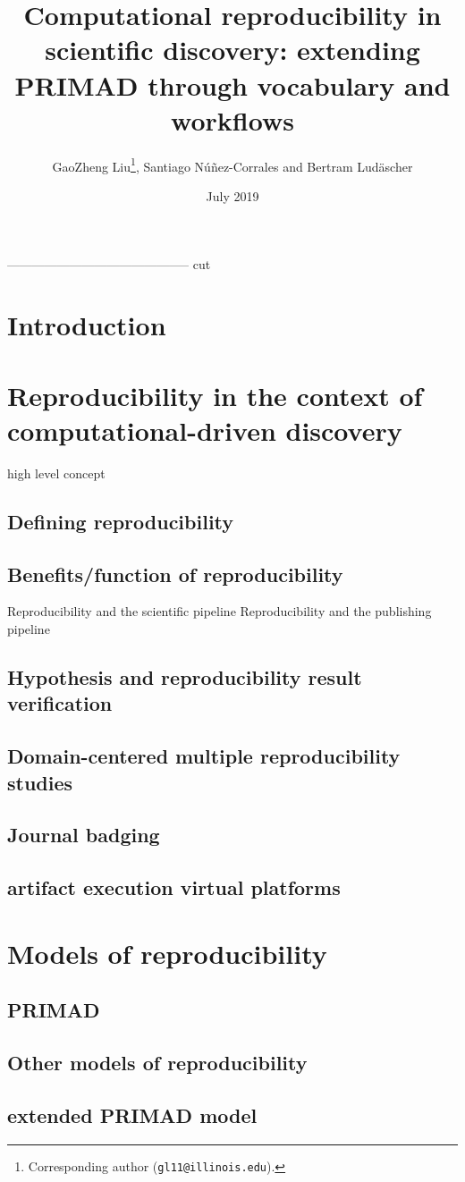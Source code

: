 \documentclass{article}
\title{Computational reproducibility in scientific discovery: extending PRIMAD through vocabulary and workflows}
\author{GaoZheng Liu\footnote{Corresponding author (\texttt{gl11@illinois.edu}).}, Santiago N\'u\~nez-Corrales and Bertram Lud\"ascher}
\date{July 2019}
\begin{document}
-------------------------------------------- cut
\section{Introduction}

\section{Reproducibility in the context of computational-driven discovery}
high level concept
\subsection{Defining reproducibility}
\subsection{Benefits/function of reproducibility}
Reproducibility and the scientific pipeline
Reproducibility and the publishing pipeline
\subsection{Hypothesis and reproducibility result verification}
\subsection{Domain-centered multiple reproducibility studies}
\subsection{Journal badging} 
\subsection{artifact execution virtual platforms}

\section{Models of reproducibility}
\subsection{PRIMAD}
\subsection{Other models of reproducibility}
\subsection{extended PRIMAD model}
\end{document}
